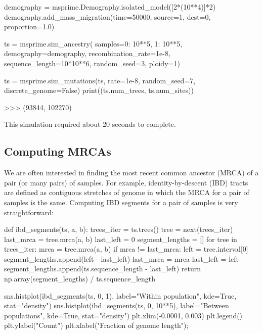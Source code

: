 \documentclass[graybox]{svmult}
\begin{document}
\begin{pythoncode}
demography = msprime.Demography.isolated_model([2*(10**4)]*2)
demography.add_mass_migration(time=50000, source=1, dest=0, proportion=1.0)

ts = msprime.sim_ancestry(
    samples={0: 10**5, 1: 10**5},
    demography=demography, recombination_rate=1e-8,
    sequence_length=10*10**6, random_seed=3,
    ploidy=1)

ts = msprime.sim_mutations(ts, rate=1e-8, random_seed=7, discrete_genome=False)
print((ts.num_trees, ts.num_sites))

>>> (93844, 102270)
\end{pythoncode}

This simulation required about 20 seconds to complete.


\subsection{Computing MRCAs}\label{computing-mrcas}

We are often interested in finding the most recent common ancestor (MRCA)
of a pair (or many pairs) of samples. For example, identity-by-descent
(IBD) tracts are defined as contiguous stretches of genome in which the
MRCA for a pair of samples is the same. Computing IBD segments for a
pair of samples is very straightforward:

\begin{pythoncode}
def ibd_segments(ts, a, b):
    trees_iter = ts.trees()
    tree = next(trees_iter)
    last_mrca = tree.mrca(a, b)
    last_left = 0
    segment_lengths = []
    for tree in trees_iter:
        mrca = tree.mrca(a, b)
        if mrca != last_mrca:
            left = tree.interval[0]
            segment_lengths.append(left - last_left)
            last_mrca = mrca
            last_left = left
    segment_lengths.append(ts.sequence_length - last_left)
    return np.array(segment_lengths) / ts.sequence_length

sns.histplot(ibd_segments(ts, 0, 1), label="Within population", kde=True,
    stat="density")
sns.histplot(ibd_segments(ts, 0, 10**5), label="Between populations", kde=True,
    stat="density")
plt.xlim(-0.0001, 0.003)
plt.legend()
plt.ylabel("Count")
plt.xlabel("Fraction of genome length");
\end{pythoncode}
\end{document}
